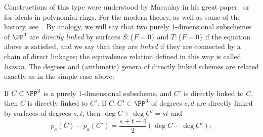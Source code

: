 Constructions of this type were understood by Macaulay in his great paper~\cite{Macaulay1913} or \cite{Eisenbud-Gray} for ideals in polynomial rings. For the modern theory, as
well as some of the history, see~\cite{MR0364271}.
By analogy, we will say that two purely 1-dimensional subschemes of $\PP^3$ are \emph{directly linked} by surfaces $S: \{F = 0\}$ and $T:  \{F = 0\}$ if
the equation above is satisfied, and we say that they are \emph{linked} if they are connected by a chain of direct linkages; the equivalence relation
defined in this way is called \emph{liaison}. The degrees and (arithmetic) genera 
of directly linked schemes are related exactly as in the simple case above:

\begin{theorem}\label{direct linkage}
If $C\subset \PP^3$ is a purely 1-dimensional subscheme, and ${C'}$ is directly linked to $C$, then $C$ is directly linked to ${C'}$.
If $C,{C'}\subset \PP^3$ of degrees $c,d$ are directly linked by surfaces of degrees $s,t$, then 
$\deg C+\deg C' = st$ and 
 \begin{equation}\label{linked genus formula}
p_a(C) - p_a({C'}) = \frac{s+t-4}{2}(\deg C - \deg C');
\end{equation}
\end{theorem}

